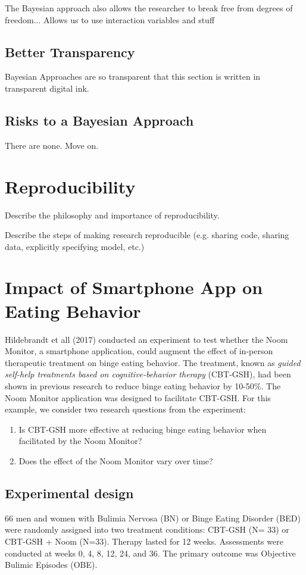 \documentclass[12pt, oneside]{article}
\begin{document}
The Bayesian approach also allows the researcher to break free from degrees of freedom... Allows us to use interaction variables and stuff

\subsection{Better Transparency}
Bayesian Approaches are so transparent that this section is written in transparent digital ink.

\subsection{Risks to a Bayesian Approach}
There are none. Move on.
\section{Reproducibility}
Describe the philosophy and importance of reproducibility.  

Describe the steps of making research reproducible (e.g. sharing code, sharing data, explicitly specifying model, etc.)

\section{Impact of Smartphone App on Eating Behavior}

Hildebrandt et all (2017) conducted an experiment to test whether the Noom Monitor, a smartphone application, could augment the effect of in-person therapeutic treatment on binge eating behavior.  The treatment, known as \emph{guided self-help treatments based on cognitive-behavior therapy} (CBT-GSH), had been shown in previous research to reduce binge eating behavior by 10-50\%.  The Noom Monitor application was designed to facilitate CBT-GSH.  For this example, we consider two research questions from the experiment:
\begin{enumerate}
\item{Is CBT-GSH more effective at reducing binge eating behavior when facilitated by the Noom Monitor?}
\item{Does the effect of the Noom Monitor vary over time?}
\end{enumerate}

\subsection{Experimental design}

66 men and women with Bulimia Nervosa (BN) or Binge Eating Disorder (BED) were randomly assigned into two treatment conditions: CBT-GSH (N= 33) or CBT-GSH + Noom (N=33).  Therapy lasted for 12 weeks.  Assessments were conducted at weeks 0, 4, 8, 12, 24, and 36.  The primary outcome was Objective Bulimic Episodes (OBE).  
\end{document}
